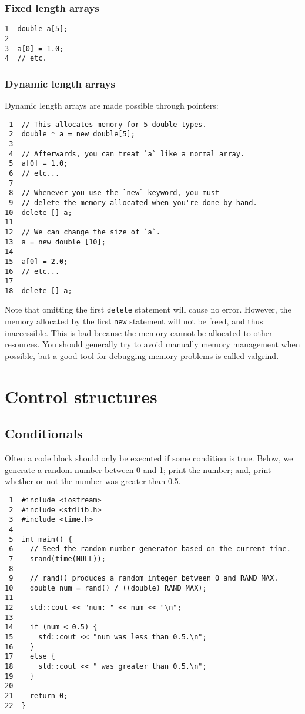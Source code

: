 \documentclass[11pt]{article}
\begin{document}
\subsubsection{Fixed length arrays}
\label{sec-3-8-1}
\begin{verbatim}
1  double a[5];
2  
3  a[0] = 1.0;
4  // etc.
\end{verbatim}

\subsubsection{Dynamic length arrays}
\label{sec-3-8-2}
Dynamic length arrays are made possible through pointers:

\begin{verbatim}
 1  // This allocates memory for 5 double types.
 2  double * a = new double[5];
 3  
 4  // Afterwards, you can treat `a` like a normal array.
 5  a[0] = 1.0;
 6  // etc...
 7  
 8  // Whenever you use the `new` keyword, you must
 9  // delete the memory allocated when you're done by hand.
10  delete [] a;
11  
12  // We can change the size of `a`.
13  a = new double [10];
14  
15  a[0] = 2.0;
16  // etc...
17  
18  delete [] a;
\end{verbatim}

Note that omitting the first \texttt{delete} statement will cause no error. 
However, the memory allocated by the first \texttt{new} statement will not 
be freed, and thus inaccessible. This is bad because the memory cannot 
be allocated to other resources. You should generally try to avoid 
manually memory management when possible, but a good tool for debugging 
memory problems is called \href{http://valgrind.org/}{valgrind}. 

\section{Control structures}
\label{sec-4}
\subsection{Conditionals}
\label{sec-4-1}
Often a code block should only be executed if some condition is true. 
Below, we generate a random number between 0 and 1; print the number; and,
print whether or not the number was greater than 0.5.

\begin{verbatim}
 1  #include <iostream>
 2  #include <stdlib.h>
 3  #include <time.h>
 4  
 5  int main() {
 6    // Seed the random number generator based on the current time.
 7    srand(time(NULL));
 8  
 9    // rand() produces a random integer between 0 and RAND_MAX.
10    double num = rand() / ((double) RAND_MAX);
11  
12    std::cout << "num: " << num << "\n";
13  
14    if (num < 0.5) {
15      std::cout << "num was less than 0.5.\n";
16    }
17    else {
18      std::cout << " was greater than 0.5.\n";
19    }
20  
21    return 0;
22  }
\end{verbatim}
\end{document}
